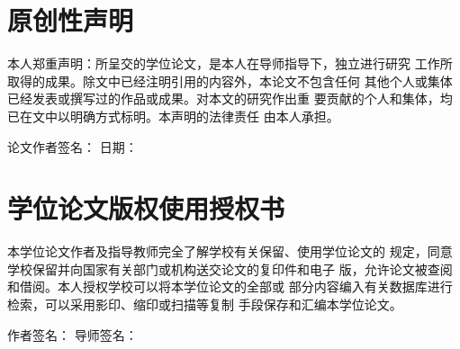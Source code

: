 \chapter*{原创性声明}
\thispagestyle{empty}
本人郑重声明：所呈交的学位论文，是本人在导师指导下，独立进行研究
工作所取得的成果。除文中已经注明引用的内容外，本论文不包含任何
其他个人或集体已经发表或撰写过的作品或成果。对本文的研究作出重
要贡献的个人和集体，均已在文中以明确方式标明。本声明的法律责任
由本人承担。

\vspace{2em}
\hfill 论文作者签名：\underline{\makebox[4cm]{}} \quad 日期：\underline{\makebox[2.5cm]{}}

\vspace{4em}

\chapter*{学位论文版权使用授权书}
\thispagestyle{empty}
本学位论文作者及指导教师完全了解学校有关保留、使用学位论文的
规定，同意学校保留并向国家有关部门或机构送交论文的复印件和电子
版，允许论文被查阅和借阅。本人授权学校可以将本学位论文的全部或
部分内容编入有关数据库进行检索，可以采用影印、缩印或扫描等复制
手段保存和汇编本学位论文。

\hfill 作者签名：\underline{\makebox[3cm]{}} \quad 导师签名：\underline{\makebox[3cm]{}}
